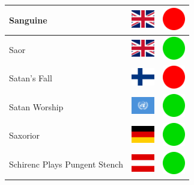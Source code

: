 \documentclass[12pt, a4paper, twoside]{report}
\begin{document}
\begin{center}
\begin{longtable}{|p{5cm}|p{2cm}|p{2cm}|}
Sanguine & \includegraphics[width=1cm]{4x3/gb} & \includegraphics[width=1cm]{likes/n} \\ \hline
Saor & \includegraphics[width=1cm]{4x3/gb} & \includegraphics[width=1cm]{likes/y} \\ \hline
Satan's Fall & \includegraphics[width=1cm]{4x3/fi} & \includegraphics[width=1cm]{likes/n} \\ \hline
Satan Worship & \includegraphics[width=1cm]{4x3/un} & \includegraphics[width=1cm]{likes/y} \\ \hline
Saxorior & \includegraphics[width=1cm]{4x3/de} & \includegraphics[width=1cm]{likes/y} \\ \hline
Schirenc Plays Pungent Stench & \includegraphics[width=1cm]{4x3/at} & \includegraphics[width=1cm]{likes/y} \\ \hline

\end{longtable}
\end{center}
\end{document}
